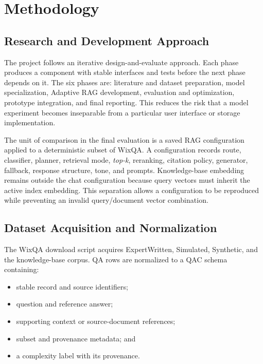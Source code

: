 \chapter{Methodology}
\label{chap:methodology}

\section{Research and Development Approach}

The project follows an iterative design-and-evaluate approach. Each phase
produces a component with stable interfaces and tests before the next phase
depends on it. The six phases are: literature and dataset preparation, model
specialization, Adaptive RAG development, evaluation and optimization,
prototype integration, and final reporting. This reduces the risk that a model
experiment becomes inseparable from a particular user interface or storage
implementation.

The unit of comparison in the final evaluation is a saved RAG configuration
applied to a deterministic subset of WixQA. A configuration records route,
classifier, planner, retrieval mode, \textit{top-k}, reranking, citation policy,
generator, fallback, response structure, tone, and prompts. Knowledge-base
embedding remains outside the chat configuration because query vectors must
inherit the active index embedding. This separation allows a configuration to
be reproduced while preventing an invalid query/document vector combination.

\section{Dataset Acquisition and Normalization}

The WixQA download script acquires ExpertWritten, Simulated, Synthetic, and the
knowledge-base corpus. QA rows are normalized to a QAC schema containing:

\begin{itemize}
  \item stable record and source identifiers;
  \item question and reference answer;
  \item supporting context or source-document references;
  \item subset and provenance metadata; and
  \item a complexity label with its provenance.
\end{itemize}

